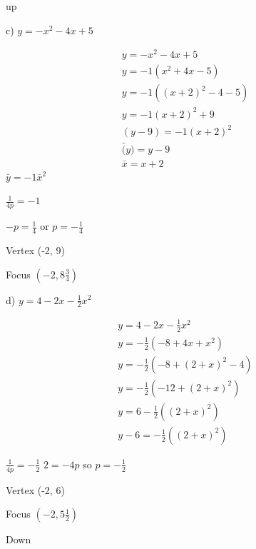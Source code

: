 \documentclass[]{report}
\begin{document}
up


c) $y = -x^2 -4x + 5$

\begin{align*}
y = -x^2 -4x + 5 \tag{1} \\
y = -1 (x^2 + 4x - 5) \tag{pulling the negative 1 out} \\
y = -1 ((x + 2)^2 -4  -5) \tag{factoring and completing the square} \\
y = -1(x+2)^2 + 9 \\
(y-9) = -1(x+2)^2 \\
\bar(y) = y-9 \\
\bar{x} = x+2
\end{align*}
$\bar{y} = -1\bar{x}^2$

$\frac{1}{4p}  = -1$

$-p = \frac{1}{4}$ or $p = -\frac{1}{4}$

Vertex (-2, 9)

Focus $(-2,  8\frac{3}{4})$


d) $y = 4 - 2x - \frac{1}{2} x^2$

\begin{align*}
y = 4 - 2x - \frac{1}{2} x^2 \tag{1} \\
y = -\frac{1}{2}(-8 + 4x + x^2) \\
y = -\frac{1}{2}(-8 + (2 + x)^2 - 4) \tag{completing the square} \\
y = -\frac{1}{2}(-12 + (2 + x)^2) \\
y = 6 -\frac{1}{2}((2 + x)^2)\\
y - 6 = -\frac{1}{2}((2 + x)^2)
\end{align*}

$\frac{1}{4p} = -\frac{1}{2}$
$2 = -4p$ so $p = -\frac{1}{2}$

Vertex (-2, 6)

Focus $(-2, 5\frac{1}{2})$

Down

\end{document}
